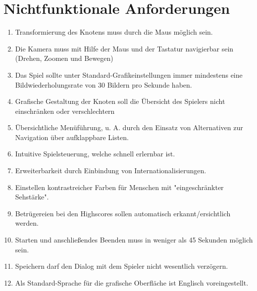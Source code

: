 \chapter{Nichtfunktionale Anforderungen}

\renewcommand{\theenumi}{/NF\_\arabic{enumi}0/}
\renewcommand{\labelenumi}{\theenumi}

\begin{enumerate}

\item Transformierung des Knotens muss durch die Maus möglich sein.
\item Die Kamera muss mit Hilfe der Maus und der Tastatur navigierbar sein (Drehen, Zoomen und Bewegen)
\item Das Spiel sollte unter Standard-Grafikeinstellungen immer mindestens eine Bildwiederholungsrate von 30 Bildern pro Sekunde haben.
\item Grafische Gestaltung der Knoten soll die Übersicht des Spielers nicht einschränken oder verschlechtern  
\item Übersichtliche Menüführung, u. A. durch den Einsatz von Alternativen zur Navigation über aufklappbare Listen.
\item Intuitive Spielsteuerung, welche schnell erlernbar ist. 
\item Erweiterbarkeit durch Einbindung von Internationalisierungen. %
\item Einstellen kontrastreicher Farben für Menschen mit "eingeschränkter Sehstärke". %
\item Betrügereien bei den Highscores sollen automatisch erkannt/ersichtlich werden. %
\item Starten und anschließendes Beenden muss in weniger als 45 Sekunden möglich sein. %
\item Speichern darf den Dialog mit dem Spieler nicht wesentlich verzögern. 
\item Als Standard-Sprache für die grafische Oberfläche ist Englisch voreingestellt.

\end{enumerate}
